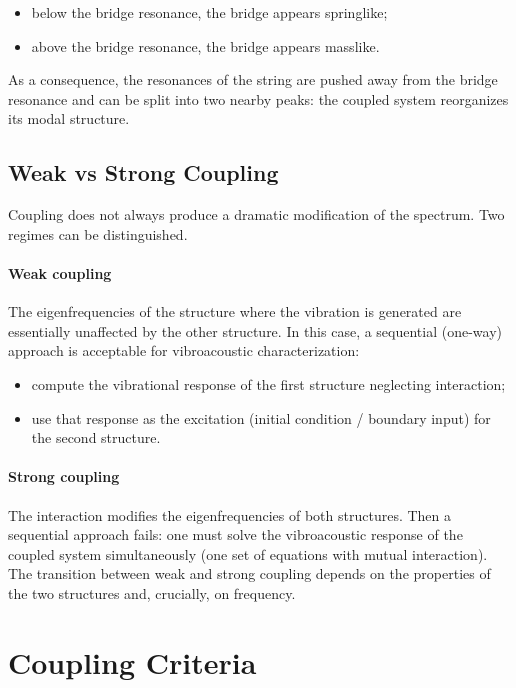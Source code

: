 \begin{itemize}
    \item below the bridge resonance, the bridge appears springlike;
    \item above the bridge resonance, the bridge appears masslike.
\end{itemize}

As a consequence, the resonances of the string are pushed away from the bridge resonance and can be split into two nearby peaks: the coupled system reorganizes its modal structure.

\subsection{Weak vs Strong Coupling}

Coupling does not always produce a dramatic modification of the spectrum. Two regimes can be distinguished.

\paragraph{Weak coupling} The eigenfrequencies of the structure where the vibration is generated are essentially unaffected by the other structure. In this case, a sequential (one-way) approach is acceptable for vibroacoustic characterization:

\begin{itemize}
    \item compute the vibrational response of the first structure neglecting interaction;
    \item use that response as the excitation (initial condition / boundary input) for the second structure.
\end{itemize}

\paragraph{Strong coupling} The interaction modifies the eigenfrequencies of both structures. Then a sequential approach fails: one must solve the vibroacoustic response of the coupled system simultaneously (one set of equations with mutual interaction). The transition between weak and strong coupling depends on the properties of the two structures and, crucially, on frequency.

\section{Coupling Criteria}

